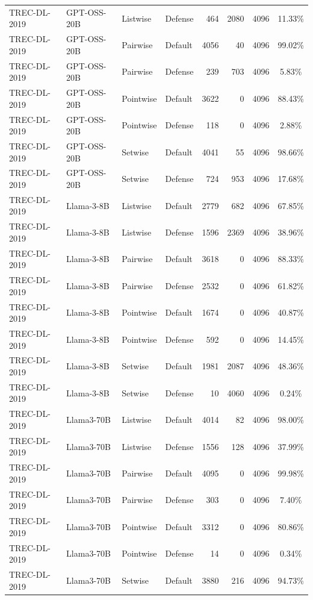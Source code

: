 \begin{table}[t]
\begin{tabular}{ll l l r r r c}
TREC-DL-2019 & GPT-OSS-20B & Listwise & Defense & 464 & 2080 & 4096 & 11.33\% \\
TREC-DL-2019 & GPT-OSS-20B & Pairwise & Default & 4056 & 40 & 4096 & 99.02\% \\
TREC-DL-2019 & GPT-OSS-20B & Pairwise & Defense & 239 & 703 & 4096 & 5.83\% \\
TREC-DL-2019 & GPT-OSS-20B & Pointwise & Default & 3622 & 0 & 4096 & 88.43\% \\
TREC-DL-2019 & GPT-OSS-20B & Pointwise & Defense & 118 & 0 & 4096 & 2.88\% \\
TREC-DL-2019 & GPT-OSS-20B & Setwise & Default & 4041 & 55 & 4096 & 98.66\% \\
TREC-DL-2019 & GPT-OSS-20B & Setwise & Defense & 724 & 953 & 4096 & 17.68\% \\
TREC-DL-2019 & Llama-3-8B & Listwise & Default & 2779 & 682 & 4096 & 67.85\% \\
TREC-DL-2019 & Llama-3-8B & Listwise & Defense & 1596 & 2369 & 4096 & 38.96\% \\
TREC-DL-2019 & Llama-3-8B & Pairwise & Default & 3618 & 0 & 4096 & 88.33\% \\
TREC-DL-2019 & Llama-3-8B & Pairwise & Defense & 2532 & 0 & 4096 & 61.82\% \\
TREC-DL-2019 & Llama-3-8B & Pointwise & Default & 1674 & 0 & 4096 & 40.87\% \\
TREC-DL-2019 & Llama-3-8B & Pointwise & Defense & 592 & 0 & 4096 & 14.45\% \\
TREC-DL-2019 & Llama-3-8B & Setwise & Default & 1981 & 2087 & 4096 & 48.36\% \\
TREC-DL-2019 & Llama-3-8B & Setwise & Defense & 10 & 4060 & 4096 & 0.24\% \\
TREC-DL-2019 & Llama3-70B & Listwise & Default & 4014 & 82 & 4096 & 98.00\% \\
TREC-DL-2019 & Llama3-70B & Listwise & Defense & 1556 & 128 & 4096 & 37.99\% \\
TREC-DL-2019 & Llama3-70B & Pairwise & Default & 4095 & 0 & 4096 & 99.98\% \\
TREC-DL-2019 & Llama3-70B & Pairwise & Defense & 303 & 0 & 4096 & 7.40\% \\
TREC-DL-2019 & Llama3-70B & Pointwise & Default & 3312 & 0 & 4096 & 80.86\% \\
TREC-DL-2019 & Llama3-70B & Pointwise & Defense & 14 & 0 & 4096 & 0.34\% \\
TREC-DL-2019 & Llama3-70B & Setwise & Default & 3880 & 216 & 4096 & 94.73\% \\

\end{tabular}
\end{table}

